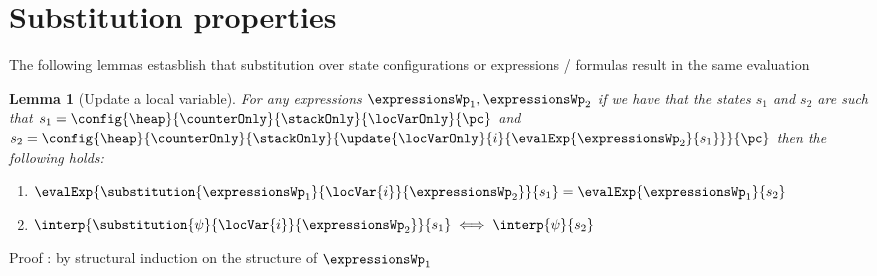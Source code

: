 
\newtheorem{substHeap}{Lemma}[section]
\newtheorem{newHeap}[substHeap]{Lemma}
\newtheorem{substStack}[substHeap]{Lemma}
\newtheorem{substCntr}[substHeap]{Lemma}
\newtheorem{substLv}[substHeap]{Lemma}
\newtheorem{substRet}[substHeap]{Lemma}


\newtheorem{valid}{Definition}[section]

\section{Substitution properties}\label{substProp}

The following lemmas estasblish that substitution over state configurations or expressions / formulas result in the same evaluation


\begin{substLv}[Update  a local variable]\label{substLv}
For any expressions $ \expressionsWp_1, \expressionsWp_2 $ 
if we have that the states $s_1$ and $s_2$ are such that
$ s_1 =   \config{\heap}{\counterOnly}{ \stackOnly }{\locVarOnly}{\pc }$ and 
$ s_2 =   \config{\heap}{\counterOnly }{ \stackOnly }{\update{\locVarOnly}{i}{ \evalExp{ \expressionsWp_2}{ s_1 } }}{\pc }  $ then 
the following holds:
\begin{enumerate}
      \item $\evalExp{\substitution{\expressionsWp_1}{ \locVar{i} }{ \expressionsWp_2 }}{ s_1 } = \evalExp{\expressionsWp_1}{s_2} $
      \item $\interp{\substitution{\psi}{ \locVar{i} }{ \expressionsWp_2 }}{ s_1 } \iff \interp{\psi}{s_2} $
\end{enumerate}
\end{substLv}
Proof : by structural induction on the structure of $\expressionsWp_1$ 
